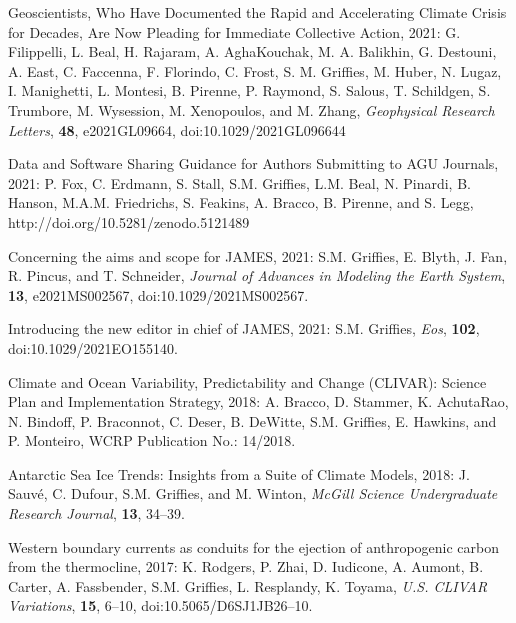 \begin{etaremune}

\item Geoscientists, Who Have Documented the Rapid and Accelerating Climate Crisis for Decades, Are Now Pleading for Immediate Collective Action, 2021: 
G. Filippelli, L. Beal, H. Rajaram, A. AghaKouchak, M. A. Balikhin, G. Destouni, A. East, C. Faccenna, F. Florindo, C. Frost, S. M. Grif\/f\/ies, M. Huber, N. Lugaz, I. Manighetti, L. Montesi, B. Pirenne, P. Raymond, S. Salous, T. Schildgen, S. Trumbore, M. Wysession, M. Xenopoulos, and M. Zhang, {\it Geophysical Research Letters}, {\bf 48}, e2021GL09664, doi:10.1029/2021GL096644

\item Data and Software Sharing Guidance for Authors Submitting to AGU Journals, 2021: P. Fox, C. Erdmann, S. Stall, S.M. Grif\/f\/ies, L.M. Beal, N. Pinardi, B. Hanson, M.A.M. Friedrichs, S. Feakins, A. Bracco, B. Pirenne, and S. Legg,  http://doi.org/10.5281/zenodo.5121489

\item Concerning the aims and scope for JAMES, 2021: S.M. Grif\/f\/ies, E. Blyth, J. Fan, R. Pincus, and T. Schneider, {\it Journal of Advances in Modeling the Earth System}, {\bf 13},  e2021MS002567, doi:10.1029/2021MS002567.

\item Introducing the new editor in chief of JAMES, 2021: S.M. Grif\/f\/ies, {\it Eos}, {\bf 102}, doi:10.1029/2021EO155140. 

\item Climate and Ocean Variability, Predictability and Change (CLIVAR): Science Plan and Implementation Strategy, 2018: A. Bracco, D. Stammer, K. AchutaRao, N. Bindoff, P. Braconnot, C. Deser, B. DeWitte, S.M. Grif\/f\/ies, E. Hawkins, and P. Monteiro, WCRP Publication No.: 14/2018. 

\item Antarctic Sea Ice Trends: Insights from a Suite of Climate Models, 2018: J. Sauv\'{e}, C. Dufour, S.M. Grif\/f\/ies, and M. Winton, {\it McGill Science Undergraduate Research Journal}, {\bf 13}, 34--39. 

\item Western boundary currents as conduits for the ejection of anthropogenic carbon from the thermocline, 2017: K. Rodgers, P. Zhai, D. Iudicone, A. Aumont, B. Carter, A. Fassbender, S.M. Grif\/f\/ies, L. Resplandy, K. Toyama, {\it U.S. CLIVAR Variations}, {\bf 15}, 6--10, doi:10.5065/D6SJ1JB26--10.


\end{etaremune}
